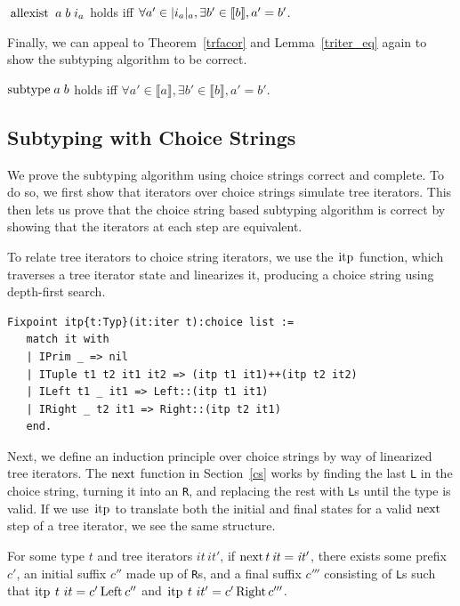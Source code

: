 \documentclass[a4paper,english]{lipics-v2019}
\newcommand{\denotes}[1]{\llbracket #1 \rrbracket}
\renewcommand{\L}{{\tt L}\xspace}
\newcommand{\Ls}{{\tt L}s\xspace}
\newcommand{\R}{{\tt R}\xspace}
\newcommand{\Rs}{{\tt R}s\xspace}
\renewcommand{\c}[1]{\ensuremath{\text{\lstinline{#1}}}\xspace}
\begin{document}
\begin{theorem}\label{trfacor}
$\c{allexist}\;a\;b\;i_a$ holds iff $\forall a'\in \irch{i_a}{a},
  \exists b'\in \denotes{b}, a'= b'$.
\end{theorem}

\noindent
Finally, we can appeal to Theorem~\ref{trfacor} and Lemma~\ref{triter_eq}
again to show the subtyping algorithm to be correct.

\begin{theorem}
$\c{subtype}\;a\;b$ holds iff $\forall a' \in \denotes{a}, \exists b' \in
  \denotes{b}, a' = b'$.
\end{theorem}

\subsection{Subtyping with Choice Strings}

We prove the subtyping algorithm using choice strings correct and complete. To
do so, we first show that iterators over choice strings simulate tree iterators. 
This then lets us prove that the choice string based subtyping algorithm is correct
by showing that the iterators at each step are equivalent.

To relate tree iterators to choice string iterators, we use the \c{itp}
function, which traverses a tree iterator state and linearizes it, producing a
choice string using depth-first search.


\begin{lstlisting}
Fixpoint itp{t:Typ}(it:iter t):choice list :=
   match it with
   | IPrim _ => nil
   | ITuple t1 t2 it1 it2 => (itp t1 it1)++(itp t2 it2)
   | ILeft t1 _ it1 => Left::(itp t1 it1)
   | IRight _ t2 it1 => Right::(itp t2 it1)
   end.
\end{lstlisting}

\noindent Next, we define an induction principle over choice strings by way of
linearized tree iterators. The \c{next} function in Section~\ref{cs} works by
finding the last \L in the choice string, turning it into an \R, and replacing
the rest with \Ls until the type is valid. If we use \c{itp} to translate
both the initial and final states for a valid \c{next} step of a tree
iterator, we see the same structure.

\begin{lemma}
\label{lem:snt}
For some type $t$ and tree iterators $\mathit{it}\,\mathit{it}'$, if
$\c{next}\,t\,\mathit{it}=\mathit{it'}$, there exists some prefix  $c'$, an
initial suffix $c''$ made up of \Rs, and a final suffix  $c'''$
consisting of \Ls such that $\c{itp}~t~it=c'\,\c{Left}\,c''$ and 
$\c{itp}~t~it'=c'\,\c{Right}\,c'''$.
\end{lemma}
\end{document}
